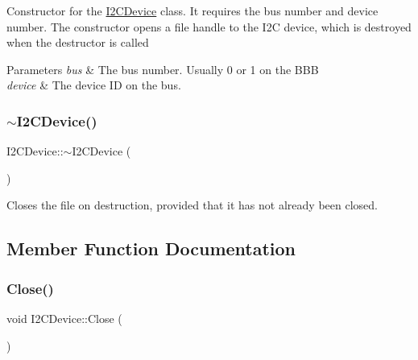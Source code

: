 Constructor for the \hyperlink{classcubesat_1_1I2CDevice}{I2\+C\+Device} class. It requires the bus number and device number. The constructor opens a file handle to the I2C device, which is destroyed when the destructor is called 
\begin{DoxyParams}{Parameters}
{\em bus} & The bus number. Usually 0 or 1 on the B\+BB \\
\hline
{\em device} & The device ID on the bus. \\
\hline
\end{DoxyParams}
\mbox{\label{classcubesat_1_1I2CDevice_aebf54d150dca31a5bd8ddd524cb5bb00}} 
\subsubsection{\texorpdfstring{$\sim$\+I2\+C\+Device()}{~I2CDevice()}}
{\footnotesize\ttfamily I2\+C\+Device\+::$\sim$\+I2\+C\+Device (\begin{DoxyParamCaption}{ }\end{DoxyParamCaption})\hspace{0.3cm}{\ttfamily [virtual]}}

Closes the file on destruction, provided that it has not already been closed. 

\subsection{Member Function Documentation}
\mbox{\label{classcubesat_1_1I2CDevice_a09c6fe7b6318662e4438ee52c21cee20}} 
\subsubsection{\texorpdfstring{Close()}{Close()}}
{\footnotesize\ttfamily void I2\+C\+Device\+::\+Close (\begin{DoxyParamCaption}{ }\end{DoxyParamCaption})\hspace{0.3cm}{\ttfamily [virtual]}}

